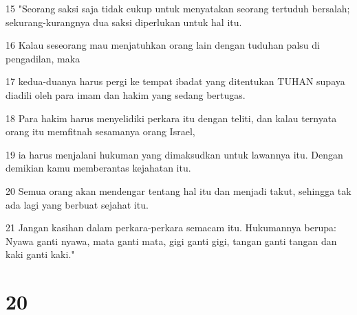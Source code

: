 \par 15 "Seorang saksi saja tidak cukup untuk menyatakan seorang tertuduh bersalah; sekurang-kurangnya dua saksi diperlukan untuk hal itu.
\par 16 Kalau seseorang mau menjatuhkan orang lain dengan tuduhan palsu di pengadilan, maka
\par 17 kedua-duanya harus pergi ke tempat ibadat yang ditentukan TUHAN supaya diadili oleh para imam dan hakim yang sedang bertugas.
\par 18 Para hakim harus menyelidiki perkara itu dengan teliti, dan kalau ternyata orang itu memfitnah sesamanya orang Israel,
\par 19 ia harus menjalani hukuman yang dimaksudkan untuk lawannya itu. Dengan demikian kamu memberantas kejahatan itu.
\par 20 Semua orang akan mendengar tentang hal itu dan menjadi takut, sehingga tak ada lagi yang berbuat sejahat itu.
\par 21 Jangan kasihan dalam perkara-perkara semacam itu. Hukumannya berupa: Nyawa ganti nyawa, mata ganti mata, gigi ganti gigi, tangan ganti tangan dan kaki ganti kaki."

\chapter{20}

